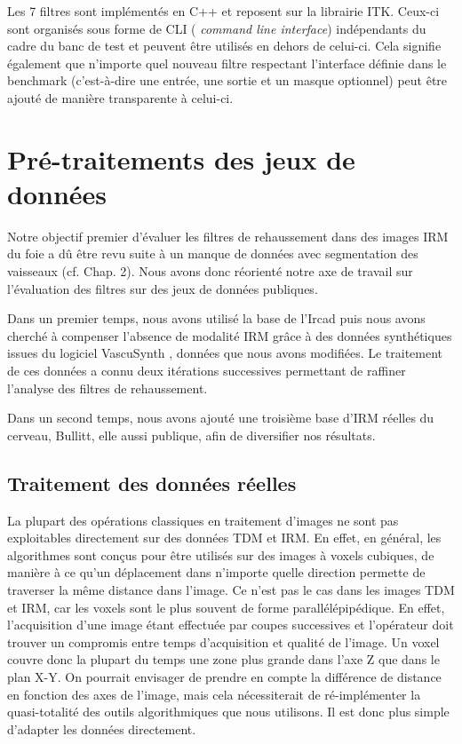 Les 7 filtres sont implémentés en C++ et reposent sur la librairie ITK. Ceux-ci sont organisés sous forme de CLI ( \textit{command line interface}) indépendants du cadre du banc de test et peuvent être utilisés en dehors de celui-ci. Cela signifie également que n'importe quel nouveau filtre respectant l'interface définie dans le benchmark (c'est-à-dire une entrée, une sortie et un masque optionnel) peut être ajouté de manière transparente à celui-ci.

\section{Pré-traitements des jeux de données}
\label{sec:Benchmark:traitement_des_données}

Notre objectif premier d'évaluer les filtres de rehaussement dans des images IRM du foie a dû être revu suite à un manque de données avec segmentation des vaisseaux (cf. Chap. 2). Nous avons donc réorienté notre axe de travail sur l'évaluation des filtres sur des jeux de données publiques.

Dans un premier temps, nous avons utilisé la base de l'Ircad puis nous avons cherché à compenser l'absence de modalité IRM grâce à des données synthétiques issues du logiciel VascuSynth \cite{Hamarneh2010_vascuSynth}, données que nous avons modifiées. Le traitement de ces données a connu deux itérations successives permettant de raffiner l'analyse des filtres de rehaussement.

Dans un second temps, nous avons ajouté une troisième base d'IRM réelles du cerveau, Bullitt, elle aussi publique, afin de diversifier nos résultats.

\subsection{Traitement des données réelles}

La plupart des opérations classiques en traitement d'images ne sont pas exploitables directement sur des données TDM et IRM. En effet, en général, les algorithmes sont conçus pour être utilisés sur des images à voxels cubiques, de manière à ce qu'un déplacement dans n'importe quelle direction permette de traverser la même distance dans l'image. Ce n'est pas le cas dans les images TDM et IRM, car les voxels sont le plus souvent de forme parallélépipédique. En effet, l'acquisition d'une image étant effectuée par coupes successives et l'opérateur doit trouver un compromis entre temps d'acquisition et qualité de l'image. Un voxel couvre donc la plupart du temps une zone plus grande dans l'axe Z que dans le plan X-Y. On pourrait envisager de prendre en compte la différence de distance en fonction des axes de l'image, mais cela nécessiterait de ré-implémenter la quasi-totalité des outils algorithmiques que nous utilisons. Il est donc plus simple d'adapter les données directement.


